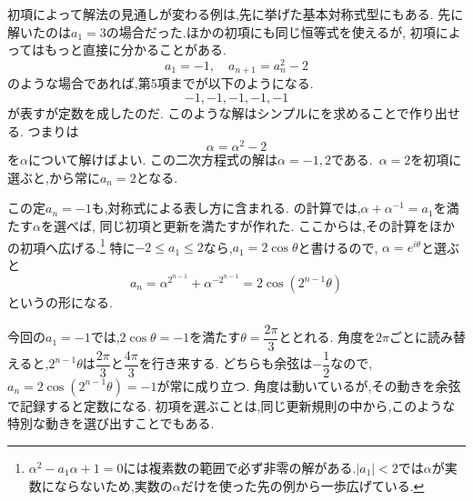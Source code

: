 初項によって解法の見通しが変わる例は,先に挙げた基本対称式型にもある.
先に解いたのは$a_1=3$の場合だった.ほかの初項にも同じ恒等式を使えるが,
初項によってはもっと直接に分かることがある.
\[
  a_1=-1,\quad a_{n+1}=a_n^2-2
\]
のような場合であれば,第5項までが以下のようになる.
\[
  -1,-1,-1,-1,-1
\]
が表すが定数を成したのだ.
このような解はシンプルにを求めることで作り出せる.
つまりは
\[
  \alpha=\alpha^2-2
\]
を$\alpha$について解けばよい.
この二次方程式の解は$\alpha=-1,2$である.
\,$\alpha=2$を初項に選ぶと,から常に$a_n=2$となる.

この定$a_n=-1$も,対称式による表し方に含まれる.
の計算では,$\alpha+\alpha^{-1}=a_1$を満たす$\alpha$を選べば,
同じ初項と更新を満たすが作れた.
ここからは,その計算をほかの初項へ広げる.\footnote{$\alpha^2-a_1\alpha+1=0$には複素数の範囲で必ず非零の解がある.$|a_1|<2$では$\alpha$が実数にならないため,実数の$\alpha$だけを使った先の例から一歩広げている.}
特に$-2\le a_1\le2$なら,$a_1=2\cos\theta$と書けるので,
$\alpha=e^{i\theta}$と選ぶと
\[
  a_n=\alpha^{2^{n-1}}+\alpha^{-2^{n-1}}=2\cos(2^{n-1}\theta)
\]
というの形になる.

今回の$a_1=-1$では,$2\cos\theta=-1$を満たす$\theta=\dfrac{2\pi}3$ととれる.
角度を$2\pi$ごとに読み替えると,$2^{n-1}\theta$は$\dfrac{2\pi}3$と$\dfrac{4\pi}3$を行き来する.
どちらも余弦は$-\dfrac12$なので,$a_n=2\cos(2^{n-1}\theta)=-1$が常に成り立つ.
角度は動いているが,その動きを余弦で記録すると定数になる.
初項を選ぶことは,同じ更新規則の中から,このような特別な動きを選び出すことでもある.
